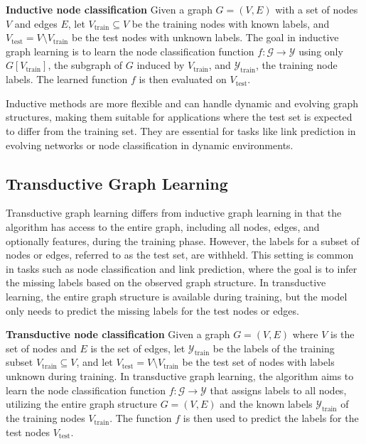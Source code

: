 \begin{example}\textbf{Inductive node classification}
	Given a graph \( G = \left( V, E \right) \) with a set of nodes \( V \) and edges \( E \), let \( V_\mathrm{train} \subseteq V \) be the training nodes with known labels, and \( V_\mathrm{test} = V \setminus V_\mathrm{train} \) be the test nodes with unknown labels. The goal in inductive graph learning is to learn the node classification function \( f: \mathcal{G} \rightarrow \mathcal{Y} \) using only \( G \left[ V_\mathrm{train} \right] \), the subgraph of \( G \) induced by \( V_\mathrm{train} \), and \( \mathcal{Y}_\mathrm{train} \), the training node labels. The learned function \( f \) is then evaluated on \( V_\mathrm{test} \).
\end{example}

Inductive methods are more flexible and can handle dynamic and evolving graph structures, making them suitable for applications where the test set is expected to differ from the training set. They are essential for tasks like link prediction in evolving networks or node classification in dynamic environments.

\subsection{Transductive Graph Learning}

Transductive graph learning differs from inductive graph learning in that the algorithm has access to the entire graph, including all nodes, edges, and optionally features, during the training phase. However, the labels for a subset of nodes or edges, referred to as the test set, are withheld. This setting is common in tasks such as node classification and link prediction, where the goal is to infer the missing labels based on the observed graph structure. In transductive learning, the entire graph structure is available during training, but the model only needs to predict the missing labels for the test nodes or edges.

\begin{example}\textbf{Transductive node classification}
	Given a graph \( G = \left( V, E \right) \) where \( V \) is the set of nodes and \( E \) is the set of edges, let \( \mathcal{Y}_\mathrm{train} \) be the labels of the training subset \( V_\mathrm{train} \subseteq V \), and let \( V_\mathrm{test} = V \setminus V_\mathrm{train} \) be the test set of nodes with labels unknown during training. In transductive graph learning, the algorithm aims to learn the node classification function \( f: \mathcal{G} \rightarrow \mathcal{Y} \) that assigns labels to all nodes, utilizing the entire graph structure \( G = \left( V, E \right) \) and the known labels \( \mathcal{Y}_\mathrm{train} \) of the training nodes \( V_\mathrm{train} \). The function \( f \) is then used to predict the labels for the test nodes \( V_\mathrm{test} \).
\end{example}

